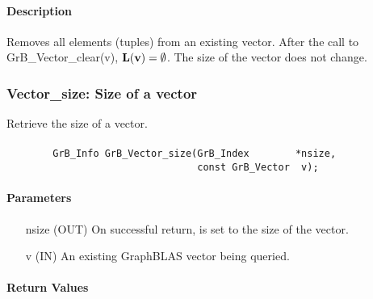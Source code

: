 \paragraph{Description}

Removes all elements (tuples) from an existing vector. After the call to
{\sf GrB\_Vector\_clear(v)}, 
$\mathbf{L}({\bf v}) = \emptyset$. The size of the vector does not change. 


\subsubsection{{\sf Vector\_size}: Size of a vector}

Retrieve the size of a vector.

\paragraph{\syntax}

\begin{verbatim}
        GrB_Info GrB_Vector_size(GrB_Index        *nsize,
                                 const GrB_Vector  v);
\end{verbatim}

\paragraph{Parameters}

\begin{itemize}[leftmargin=1.1in]
    \item[{\sf nsize}] ({\sf OUT}) On successful return, is set to the size 
                                   of the vector.
    \item[{\sf v}]     ({\sf IN})  An existing GraphBLAS vector being queried.
\end{itemize}

\paragraph{Return Values}

